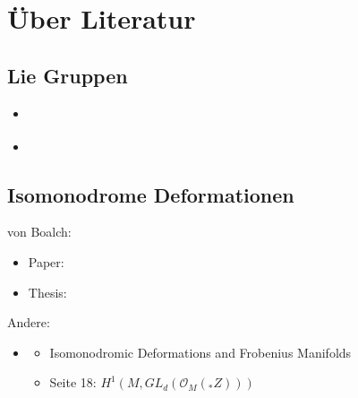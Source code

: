 \chapter{Über Literatur}
\section{Lie Gruppen}
\begin{itemize}
  \item \cite{warnerLie}
  \item \cite{bryant}
\end{itemize}
\section{Isomonodrome Deformationen}
von Boalch:
\begin{itemize}
  \item Paper: \cite{boalch}
  \item Thesis: \cite{thboalch}
\end{itemize}
Andere:
\begin{itemize}
  \item \cite{sabbah2007isomonodromic}
    \begin{itemize}
      \item Isomonodromic Deformations and Frobenius Manifolds
      \item Seite 18: $H^1(M,GL_d(\mathcal{O}_M({}_*Z)))$
    \end{itemize}
\end{itemize}
